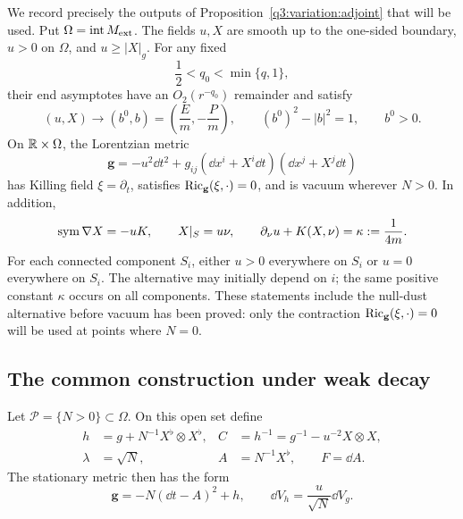We record precisely the outputs of Proposition~\ref{q3:variation:adjoint}
that will be used.
Put \(\Omega=\operatorname{int}M_{\mathrm{ext}}\).
The fields \(u,X\) are smooth up to the one-sided boundary,
\(u>0\) on \(\Omega\), and \(u\geq |X|_g\).
For any fixed
\[
\frac12<q_0<\min\{q,1\},
\]
their end asymptotes have an \(O_2(r^{-q_0})\) remainder and satisfy
\begin{equation}
\label{q3:static:asymptotic-field}
(u,X)\longrightarrow(b^0,b)
 =\left(\frac Em,-\frac Pm\right),
\qquad (b^0)^2-|b|^2=1,\qquad b^0>0.
\end{equation}
On \(\mathbb R\times\Omega\), the Lorentzian metric
\begin{equation}
\label{q3:static:stationary-metric}
\mathbf g=-u^2\dd t^2+
 g_{ij}(\dd x^i+X^i\dd t)(\dd x^j+X^j\dd t)
\end{equation}
has Killing field \(\xi=\partial_t\), satisfies
\(\operatorname{Ric}_{\mathbf g}(\xi,\cdot)=0\), and is vacuum wherever \(N>0\).
In addition,
\begin{equation}
\label{q3:static:kid-boundary}
\operatorname{sym}\nabla X=-uK,\qquad
X|_S=u\nu,\qquad
\partial_\nu u+K(X,\nu)=\kappa:=\frac1{4m}.
\end{equation}
For each connected component $S_i$, either $u>0$ everywhere on $S_i$
or $u=0$ everywhere on $S_i$. The alternative may initially depend on
$i$; the same positive constant $\kappa$ occurs on all components.
These statements include the null-dust alternative before vacuum has
been proved: only the contraction \(\operatorname{Ric}_{\mathbf g}(\xi,\cdot)=0\)
will be used at points where \(N=0\).

\subsection{The common construction under weak decay}
\label{q3:static:base-subsection}

Let \(\mathcal P=\{N>0\}\subset\Omega\). On this open set define
\begin{equation}
\label{q3:static:base-definitions}
\begin{aligned}
h&=g+N^{-1}X^\flat\otimes X^\flat,
& C&=h^{-1}=g^{-1}-u^{-2}X\otimes X,\\
\lambda&=\sqrt N,
& A&=N^{-1}X^\flat,\qquad F=\dd A .
\end{aligned}
\end{equation}
The stationary metric then has the form
\begin{equation}
\label{q3:static:threading-form}
\mathbf g=-N(\dd t-A)^2+h,\qquad
\dd V_h=\frac u{\sqrt N}\dd V_g.
\end{equation}

